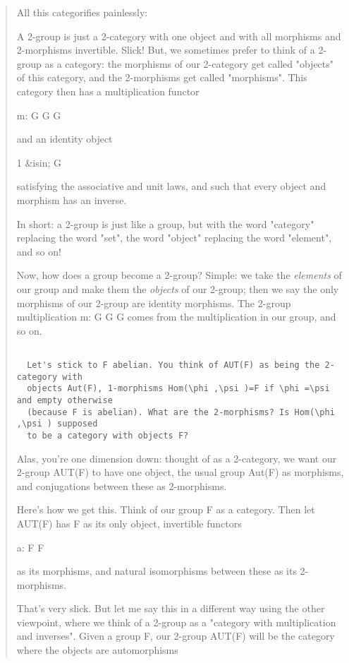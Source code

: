\begin{quote}
All this categorifies painlessly:

A 2-group is just a 2-category with one object and with all morphisms and 
2-morphisms invertible.  Slick!  But, we sometimes prefer to think of a 
2-group as a category: the morphisms of our 2-category get called 
"objects" of this category, and the 2-morphisms get called 
"morphisms".  This category
then has a multiplication functor

m: G \times  G \to  G

and an identity object

1 &isin; G

satisfying the associative and unit laws, and such that every object
and morphism has an inverse.  

In short: a 2-group is just like a group, but with the word 
"category"
replacing the word "set", the word "object" 
replacing the word "element", and so on!

Now, how does a group become a 2-group?  Simple: we take the \emph{elements}
of our group and make them the \emph{objects} of our 2-group; then we say the
only morphisms of our 2-group are identity morphisms.  The 2-group 
multiplication m: G \times  G \to  G
comes from the multiplication in our group, and so on.


\begin{verbatim}

  Let's stick to F abelian. You think of AUT(F) as being the 2-category with
  objects Aut(F), 1-morphisms Hom(\phi ,\psi )=F if \phi =\psi  and empty otherwise
  (because F is abelian). What are the 2-morphisms? Is Hom(\phi ,\psi ) supposed
  to be a category with objects F?
\end{verbatim}
    

Alas, you're one dimension down: thought of as a 2-category, we want our
2-group AUT(F) to have one object, the usual group Aut(F) as morphisms, 
and conjugations between these as 2-morphisms.  

Here's how we get this.  Think of our group F as a category.  Then 
let AUT(F) has F as its only object, invertible functors 

a: F \to  F

as its morphisms, and natural isomorphisms between these as its 2-morphisms.

That's very slick.  But let me say this in a different way using the
other viewpoint, where we think of a 2-group as a "category with 
multiplication and inverses".  Given a group F, our 2-group AUT(F) 
will be the category where the objects are automorphisms


\end{quote}
